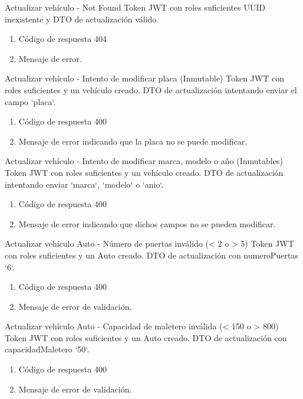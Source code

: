 {Actualizar vehículo - Not Found}
{Token JWT con roles suficientes}
{UUID inexistente y DTO de actualización válido.}
{\begin{enumerate} [leftmargin=*, nosep]
    \item Código de respuesta 404
    \item Mensaje de error.
\end{enumerate}}

{Actualizar vehículo - Intento de modificar placa (Inmutable)}
{Token JWT con roles suficientes y un vehículo creado.}
{DTO de actualización intentando enviar el campo `placa`.}
{\begin{enumerate} [leftmargin=*, nosep]
    \item Código de respuesta 400
    \item Mensaje de error indicando que la placa no se puede modificar.
\end{enumerate}}

{Actualizar vehículo - Intento de modificar marca, modelo o año (Inmutables)}
{Token JWT con roles suficientes y un vehículo creado.}
{DTO de actualización intentando enviar `marca`, `modelo` o `anio`.}
{\begin{enumerate} [leftmargin=*, nosep]
    \item Código de respuesta 400
    \item Mensaje de error indicando que dichos campos no se pueden modificar.
\end{enumerate}}

{Actualizar vehículo Auto - Número de puertas inválido (< 2 o > 5)}
{Token JWT con roles suficientes y un Auto creado.}
{DTO de actualización con numeroPuertas `6`.}
{\begin{enumerate} [leftmargin=*, nosep]
    \item Código de respuesta 400
    \item Mensaje de error de validación.
\end{enumerate}}

{Actualizar vehículo Auto - Capacidad de maletero inválida (< 150 o > 800)}
{Token JWT con roles suficientes y un Auto creado.}
{DTO de actualización con capacidadMaletero `50`.}
{\begin{enumerate} [leftmargin=*, nosep]
    \item Código de respuesta 400
    \item Mensaje de error de validación.
\end{enumerate}}

